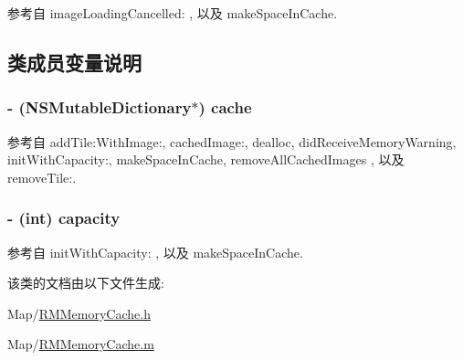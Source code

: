 参考自 image\-Loading\-Cancelled\-: , 以及 make\-Space\-In\-Cache.



\subsection{类成员变量说明}
\hypertarget{interface_r_m_memory_cache_a8e9bad5e8d5ae61cc4fe9d9a64f9d8da}{
\subsubsection[{cache}]{\setlength{\rightskip}{0pt plus 5cm}-\/ (N\-S\-Mutable\-Dictionary$\ast$) cache\hspace{0.3cm}{\ttfamily [protected]}}}\label{interface_r_m_memory_cache_a8e9bad5e8d5ae61cc4fe9d9a64f9d8da}


参考自 add\-Tile\-:\-With\-Image\-:, cached\-Image\-:, dealloc, did\-Receive\-Memory\-Warning, init\-With\-Capacity\-:, make\-Space\-In\-Cache, remove\-All\-Cached\-Images , 以及 remove\-Tile\-:.

\hypertarget{interface_r_m_memory_cache_a54f6971b0c858f13423b26ba6bf5633e}{
\subsubsection[{capacity}]{\setlength{\rightskip}{0pt plus 5cm}-\/ (int) capacity\hspace{0.3cm}{\ttfamily [protected]}}}\label{interface_r_m_memory_cache_a54f6971b0c858f13423b26ba6bf5633e}


参考自 init\-With\-Capacity\-: , 以及 make\-Space\-In\-Cache.



该类的文档由以下文件生成\-:\begin{DoxyCompactItemize}
\item 
Map/\hyperlink{_r_m_memory_cache_8h}{R\-M\-Memory\-Cache.\-h}\item 
Map/\hyperlink{_r_m_memory_cache_8m}{R\-M\-Memory\-Cache.\-m}\end{DoxyCompactItemize}
